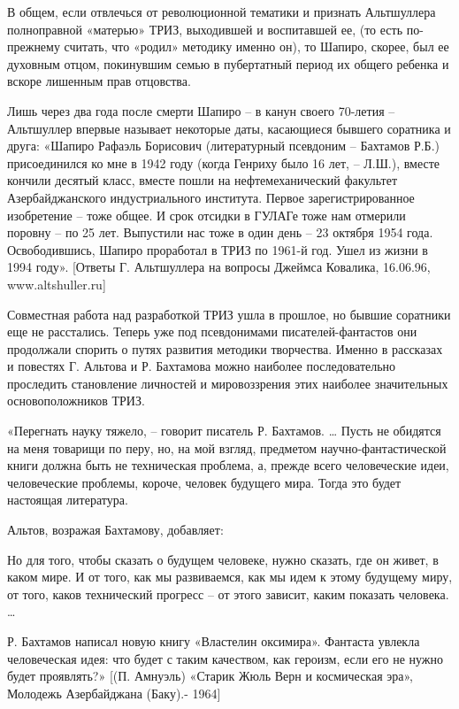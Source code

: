 \documentclass[11pt,a4paper]{article}
\begin{document}
В общем, если отвлечься от революционной тематики и признать Альтшуллера
полноправной «матерью» ТРИЗ, выходившей и воспитавшей ее, (то есть по-прежнему
считать, что «родил» методику именно он), то Шапиро, скорее, был ее духовным
отцом, покинувшим семью в пубертатный период их общего ребенка и вскоре
лишенным прав отцовства.

Лишь через два года после смерти Шапиро -- в канун своего 70-летия --
Альтшуллер впервые называет некоторые даты, касающиеся бывшего соратника и
друга: «Шапиро Рафаэль Борисович (литературный псевдоним -- Бахтамов Р.Б.)
присоединился ко мне в 1942 году (когда Генриху было 16 лет, -- Л.Ш.), вместе
кончили десятый класс, вместе пошли на нефтемеханический факультет
Азербайджанского индустриального института. Первое зарегистрированное
изобретение -- тоже общее. И срок отсидки в ГУЛАГе тоже нам отмерили поровну
-- по 25 лет. Выпустили нас тоже в один день -- 23 октября 1954 года.
Освободившись, Шапиро проработал в ТРИЗ по 1961-й год. Ушел из жизни в 1994
году». [Ответы Г. Альтшуллера на вопросы Джеймса Ковалика, 16.06.96,
  www.altshuller.ru]

Совместная работа над разработкой ТРИЗ ушла в прошлое, но бывшие соратники еще
не расстались. Теперь уже под псевдонимами писателей-фантастов они продолжали
спорить о путях развития методики творчества. Именно в рассказах и повестях
Г. Альтова и Р. Бахтамова можно наиболее последовательно проследить
становление личностей и мировоззрения этих наиболее значительных
основоположников ТРИЗ.

«Перегнать науку тяжело, -- говорит писатель Р. Бахтамов. … Пусть не обидятся
на меня товарищи по перу, но, на мой взгляд, предметом научно-фантастической
книги должна быть не техническая проблема, а, прежде всего человеческие идеи,
человеческие проблемы, короче, человек будущего мира. Тогда это будет
настоящая литература.

Альтов, возражая Бахтамову, добавляет:

Но для того, чтобы сказать о будущем человеке, нужно сказать, где он живет,
в каком мире. И от того, как мы развиваемся, как мы идем к этому будущему
миру, от того, каков технический прогресс -- от этого зависит, каким показать
человека. …

Р. Бахтамов написал новую книгу «Властелин оксимира». Фантаста увлекла
человеческая идея: что будет с таким качеством, как героизм, если его не нужно
будет проявлять?» [(П. Амнуэль) «Старик Жюль Верн и космическая эра», Молодежь
  Азербайджана (Баку).- 1964]
\end{document}

